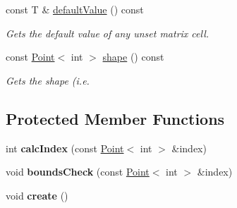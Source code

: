 \begin{DoxyCompactItemize}
\item 
\hypertarget{classrepast_1_1_matrix_ab7d7c37233ead4a6a68feaf344b3ff38}{const T \& \hyperlink{classrepast_1_1_matrix_ab7d7c37233ead4a6a68feaf344b3ff38}{default\-Value} () const }\label{classrepast_1_1_matrix_ab7d7c37233ead4a6a68feaf344b3ff38}

\begin{DoxyCompactList}\small\item\em Gets the default value of any unset matrix cell. \end{DoxyCompactList}\item 
const \hyperlink{classrepast_1_1_point}{Point}$<$ int $>$ \hyperlink{classrepast_1_1_matrix_aa81d61acab94e9de748a647ed3ef535f}{shape} () const 
\begin{DoxyCompactList}\small\item\em Gets the shape (i.\-e. \end{DoxyCompactList}\end{DoxyCompactItemize}
\subsection*{Protected Member Functions}
\begin{DoxyCompactItemize}
\item 
\hypertarget{classrepast_1_1_matrix_af7dd562d3d48904888c131ce3b53e4fd}{int {\bfseries calc\-Index} (const \hyperlink{classrepast_1_1_point}{Point}$<$ int $>$ \&index)}\label{classrepast_1_1_matrix_af7dd562d3d48904888c131ce3b53e4fd}

\item 
\hypertarget{classrepast_1_1_matrix_ae5b989256328e66805b51bb7b27edc53}{void {\bfseries bounds\-Check} (const \hyperlink{classrepast_1_1_point}{Point}$<$ int $>$ \&index)}\label{classrepast_1_1_matrix_ae5b989256328e66805b51bb7b27edc53}

\item 
\hypertarget{classrepast_1_1_matrix_a21922251aaa359c5a853640f60e4a0fc}{void {\bfseries create} ()}\label{classrepast_1_1_matrix_a21922251aaa359c5a853640f60e4a0fc}

\end{DoxyCompactItemize}
